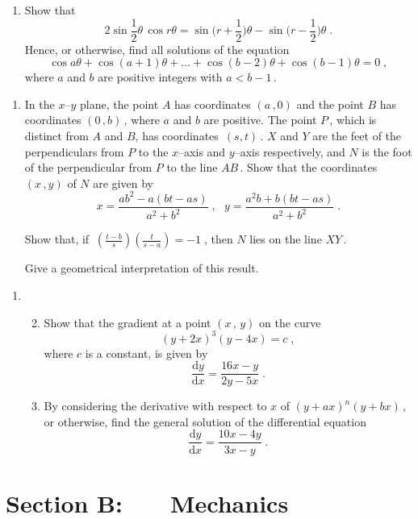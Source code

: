 \documentclass[a4, 11pt]{report}
\newlength{\qspace}
\newcounter{qnumber}
\newenvironment{question}%
 {\vspace{\qspace}
  \begin{enumerate}[\bfseries 1\quad][10]%
    \setcounter{enumi}{\value{qnumber}}%
    \item%
 }
{
  \end{enumerate}
  \filbreak
  \stepcounter{qnumber}
 }
\newenvironment{questionparts}[1][1]%
 {
  \begin{enumerate}[\bfseries (i)]%
    \setcounter{enumii}{#1}
    \addtocounter{enumii}{-1}
    \setlength{\itemsep}{5mm}
    \setlength{\parskip}{8pt}
 }
 {
  \end{enumerate}
 }
\def\d{{\mathrm d}}
\newcommand{\ds}{\displaystyle}
\newcommand{\ts}{\textstyle}
\def\l{\left(}
\def\r{\right)}
\begin{document}
\begin{question}
Show that 
\[   
\ts
2\sin \frac12 \theta \, \cos r\theta  = \sin\big(r+\frac12\big)\theta -
\sin\big(r-\frac12\big)\theta
\;.   
\]   
Hence, or otherwise,    
find all solutions of the equation   
\[   
\cos a\theta + \cos (a + 1) \theta + \dots + \cos(b-2)\theta+\cos (b - 1 ) \theta = 0
\;,   
\]   
where $a$ and $b$ are positive integers with $a < b-1\,$.  
\end{question}
	
\begin{question}
In the $x$--$y$ plane, the point $A$ has coordinates    
$(a\,,0)$ and the point $B$ has coordinates $(0\,,b)\,$,    
where $a$ and $b$ are positive.    
The point $P\,$, which is distinct from $A$ and $B$, has coordinates~$(s,t)\,$.
$X$ and $Y$ are the feet of the perpendiculars from $P$ to the $x$--axis and
$y$--axis respectively, and     
$N$ is the foot of the perpendicular from $P$ to the line $AB\,$.   
Show that the coordinates $(x\,,y)$ of $N$ are given by   
\[   
x= \frac {ab^2 -a(bt-as)}{a^2+b^2} \;, \ \ \    
y = \frac{a^2b +b(bt-as)}{a^2+b^2} \;.   
\]   
   
Show that, if    
$\ds   \
\left( \frac{t-b} s\right)\left( \frac t {s-a}\right) = -1\;$, then $N$ lies on    
the line $XY\,$.   
   
Give a geometrical interpretation of this result.   
\end{question}
		
\begin{question}	
\begin{questionparts}
\item Show that the gradient at a point $\l x\,, \, y \r$ on the curve 
\[
\l y + 2x \r^3 \l y - 4x \r = c\;,
\]
where $c$ is a constant, is given by
\[
\frac{\d y}{\d x} = \frac{16 x -y}{2y-5x} \;.
\]

\item By considering the derivative with respect to $x$ of 
$\l y + ax \r^n \l y + bx \r\,$, or otherwise, 
find the general solution of the differential equation
\[
\frac{\mathrm{d}y}{ \mathrm{d}x} = \frac{10x - 4y}{  3x - y}\;.
\]

\end{questionparts}
\end{question}	
		

		
	
\newpage
\section*{Section B: \ \ \ Mechanics}
\end{document}
